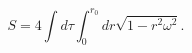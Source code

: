 \begin{equation}
S = 4 \int d\tau \int_0^{r_0}  dr \sqrt{1-r^2 \omega^2} .
\label{sng2}
\end{equation}

